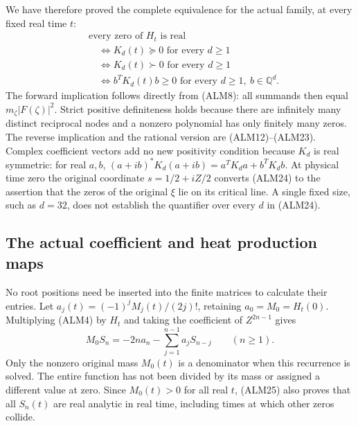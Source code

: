 We have therefore proved the complete equivalence for the actual
family, at every fixed real time $t$:
\begin{equation}\tag{ALM24}
\begin{aligned}
 &\text{every zero of }H_t\text{ is real}\\
 &\quad\Longleftrightarrow K_d(t)\succeq0\text{ for every }d\ge1\\
 &\quad\Longleftrightarrow K_d(t)\succ0\text{ for every }d\ge1\\
 &\quad\Longleftrightarrow
       b^TK_d(t)b\ge0\text{ for every }d\ge1,\ b\in\mathbb Q^d.
\end{aligned}
\end{equation}
The forward implication follows directly from (ALM8): all summands
then equal $m_\zeta|F(\zeta)|^2$. Strict positive definiteness holds
because there are infinitely many distinct reciprocal nodes and a
nonzero polynomial has only finitely many zeros. The reverse
implication and the rational version are (ALM12)--(ALM23).
Complex coefficient vectors add no new positivity condition because
$K_d$ is real symmetric: for real $a,b$,
$(a+ib)^*K_d(a+ib)=a^TK_da+b^TK_db$.
At physical time zero the original coordinate
$s=1/2+iZ/2$ converts (ALM24) to the assertion that the zeros of the
original $\xi$ lie on its critical line. A single fixed size, such as
$d=32$, does not establish the quantifier over every $d$ in (ALM24).

\subsection{The actual coefficient and heat production maps}

No root positions need be inserted into the finite matrices to
calculate their entries. Let $a_j(t)=(-1)^jM_j(t)/(2j)!$, retaining
$a_0=M_0=H_t(0)$. Multiplying (ALM4) by $H_t$ and taking the
coefficient of $Z^{2n-1}$ gives
\begin{equation}\tag{ALM25}
 M_0S_n=-2n a_n-\sum_{j=1}^{n-1}a_jS_{n-j}\qquad(n\ge1).
\end{equation}
Only the nonzero original mass $M_0(t)$ is a denominator when this
recurrence is solved. The entire function has not been divided by its
mass or assigned a different value at zero. Since $M_0(t)>0$ for all
real $t$, (ALM25) also proves that all $S_n(t)$ are real analytic in
real time, including times at which other zeros collide.

